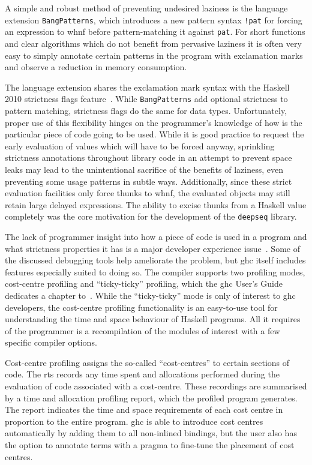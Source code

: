 \documentclass[thesis=B,english]{FITthesis}[2019/12/23]
\newcommand{\hackage}[1]{\texttt{#1}}
\newcommand{\hsPat}[1]{\texttt{#1}}
\begin{document}
A simple and robust method of preventing undesired laziness is the
language extension \texttt{BangPatterns}, which introduces a new pattern syntax
\hsPat{!pat} for forcing an expression to \acrshort{whnf} before
pattern-matching it against \hsPat{pat}. For short functions and clear
algorithms which do not benefit from pervasive laziness it is often very easy
to simply annotate certain patterns in the program with exclamation marks and
observe a reduction in memory consumption.

The language extension shares the exclamation mark syntax with the Haskell 2010
strictness flags feature~\cite{haskell2010-strictness-flags}. While
\texttt{BangPatterns} add optional strictness to pattern matching, strictness
flags do the same for data types. Unfortunately, proper use of this flexibility
hinges on the programmer's knowledge of how is the particular piece of code
going to be used. While it is good practice to request the early evaluation of
values which will have to be forced anyway, sprinkling strictness annotations
throughout library code in an attempt to prevent space leaks may lead to the
unintentional sacrifice of the benefits of laziness, even preventing some usage
patterns in subtle ways. Additionally, since these strict evaluation facilities
only force thunks to \acrshort{whnf}, the evaluated objects may still retain
large delayed expressions. The ability to excise thunks from a Haskell value
completely was the core motivation for the development of the \hackage{deepseq}
library.

The lack of programmer insight into how a piece of code is used in a program
and what strictness properties it has is a major developer experience
issue~\cite{memory-profiling-blog-post, anatomy-of-thunk-leak-blog-post,
nothunks-blog-post, haskell-space-leaks, detecting-space-leaks-blog-post}.
Some of the discussed debugging tools help ameliorate the problem, but
\acrshort{ghc} itself includes features especially suited to doing so. The
compiler supports two profiling modes, cost-centre profiling and
``ticky-ticky'' profiling, which the \acrshort{ghc} User's Guide dedicates a
chapter to~\cite{ghc-profiling}. While the ``ticky-ticky'' mode is only of
interest to \acrshort{ghc} developers, the cost-centre profiling functionality
is an easy-to-use tool for understanding the time and space behaviour of
Haskell programs. All it requires of the programmer is a recompilation of the
modules of interest with a few specific compiler options.

Cost-centre profiling assigns the so-called ``cost-centres'' to certain
sections of code. The \acrshort{rts} records any time spent and allocations
performed during the evaluation of code associated with a cost-centre. These
recordings are summarised by a time and allocation profiling report, which the
profiled program generates. The report indicates the time and space
requirements of each cost centre in proportion to the entire program.
\acrshort{ghc} is able to introduce cost centres automatically by adding them
to all non-in\-lined bindings, but the user also has the option to annotate
terms with a pragma to fine-tune the placement of cost centres.
\end{document}
